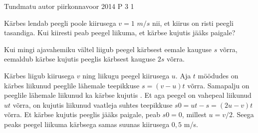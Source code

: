 {Tundmatu autor} %
{piirkonnavoor} %
{2014} %
{P 3} %
{1} %
{
\ifStatement
Kärbes lendab peegli poole kiirusega $v = 1$ $m/s$ nii, et kiirus on risti peegli tasandiga. Kui kiiresti peab peegel liikuma, et kärbse kujutis jääks paigale?
\fi


\ifHint
Kui mingi ajavahemiku vältel liigub peegel kärbsest eemale kauguse $s$ võrra, eemaldub kärbse kujutis peeglis kärbsest kauguse $2s$ võrra.
\fi

\ifSolution
Kärbes liigub kiirusega $v$ ning liikugu peegel kiirusega $u$. Aja $t$ möödudes on kärbes liikunud peeglile lähemale teepikkuse $s = (v -u)t$ võrra. Samapalju on peeglile lähemale liikunud ka kärbse kujutis . Et aga peegel on vahepeal liikunud $ut$ võrra, on kujutis liikunud vaatleja suhtes teepikkuse $s 0 = ut -s = (2u -v)t$ võrra. Et kärbse kujutis peeglis jääks paigale, peab $s 0 = 0$, millest $u = v/2$. Seega peaks peegel liikuma kärbsega samas suunas kiirusega $0,5$ m/s.
\fi
}